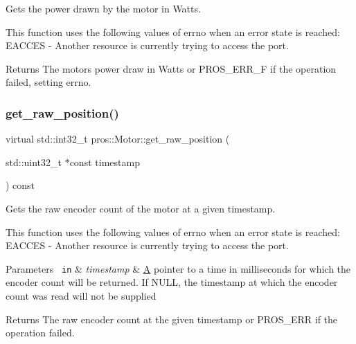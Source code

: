 Gets the power drawn by the motor in Watts. 

This function uses the following values of errno when an error state is reached\+: E\+A\+C\+C\+ES -\/ Another resource is currently trying to access the port.

\begin{DoxyReturn}{Returns}
The motor\textquotesingle{}s power draw in Watts or P\+R\+O\+S\+\_\+\+E\+R\+R\+\_\+F if the operation failed, setting errno. 
\end{DoxyReturn}
\mbox{\label{classpros_1_1Motor_ae82c57d590e18d7d90afec1e9cc3bb4e}} 
\subsubsection{\texorpdfstring{get\_raw\_position()}{get\_raw\_position()}}
{\footnotesize\ttfamily virtual std\+::int32\+\_\+t pros\+::\+Motor\+::get\+\_\+raw\+\_\+position (\begin{DoxyParamCaption}\item[{std\+::uint32\+\_\+t $\ast$const}]{timestamp }\end{DoxyParamCaption}) const\hspace{0.3cm}{\ttfamily [virtual]}}



Gets the raw encoder count of the motor at a given timestamp. 

This function uses the following values of errno when an error state is reached\+: E\+A\+C\+C\+ES -\/ Another resource is currently trying to access the port.


\begin{DoxyParams}[1]{Parameters}
\mbox{\texttt{ in}}  & {\em timestamp} & \mbox{\hyperlink{structA}{A}} pointer to a time in milliseconds for which the encoder count will be returned. If N\+U\+LL, the timestamp at which the encoder count was read will not be supplied\\
\hline
\end{DoxyParams}
\begin{DoxyReturn}{Returns}
The raw encoder count at the given timestamp or P\+R\+O\+S\+\_\+\+E\+RR if the operation failed. 
\end{DoxyReturn}
\mbox{\label{classpros_1_1Motor_a7ad83a73bf15b94aaad8d10970bb254c}} 

